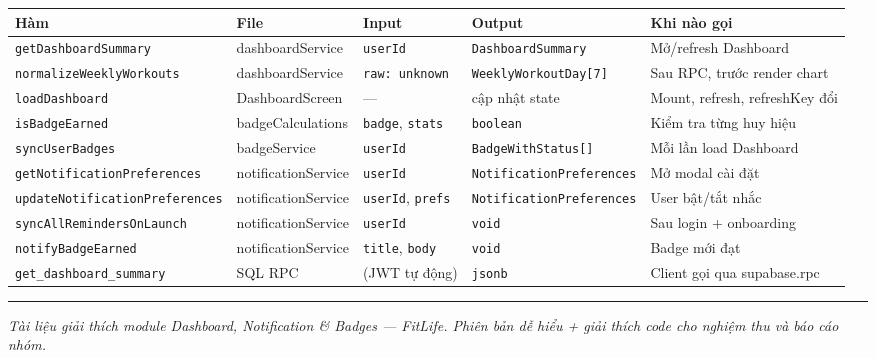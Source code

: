 \documentclass[12pt,a4paper]{article}
\newcounter{none}
\begin{document}
{\def\LTcaptype{none} %
\begin{longtable}[]{@{}
  >{\raggedright\arraybackslash}p{}
  >{\raggedright\arraybackslash}p{}
  >{\raggedright\arraybackslash}p{}
  >{\raggedright\arraybackslash}p{}
  >{\raggedright\arraybackslash}p{}@{}}
\toprule\noalign{}
\begin{minipage}[b]{\linewidth}\raggedright
Hàm
\end{minipage} & \begin{minipage}[b]{\linewidth}\raggedright
File
\end{minipage} & \begin{minipage}[b]{\linewidth}\raggedright
Input
\end{minipage} & \begin{minipage}[b]{\linewidth}\raggedright
Output
\end{minipage} & \begin{minipage}[b]{\linewidth}\raggedright
Khi nào gọi
\end{minipage} \\
\midrule\noalign{}
\endhead
\bottomrule\noalign{}
\endlastfoot
\texttt{getDashboardSummary} & dashboardService & \texttt{userId} &
\texttt{DashboardSummary} & Mở/refresh Dashboard \\
\texttt{normalizeWeeklyWorkouts} & dashboardService &
\texttt{raw:\ unknown} & \texttt{WeeklyWorkoutDay{[}7{]}} & Sau RPC,
trước render chart \\
\texttt{loadDashboard} & DashboardScreen & --- & cập nhật state & Mount,
refresh, refreshKey đổi \\
\texttt{isBadgeEarned} & badgeCalculations & \texttt{badge},
\texttt{stats} & \texttt{boolean} & Kiểm tra từng huy hiệu \\
\texttt{syncUserBadges} & badgeService & \texttt{userId} &
\texttt{BadgeWithStatus{[}{]}} & Mỗi lần load Dashboard \\
\texttt{getNotificationPreferences} & notificationService &
\texttt{userId} & \texttt{NotificationPreferences} & Mở modal cài đặt \\
\texttt{updateNotificationPreferences} & notificationService &
\texttt{userId}, \texttt{prefs} & \texttt{NotificationPreferences} &
User bật/tắt nhắc \\
\texttt{syncAllRemindersOnLaunch} & notificationService &
\texttt{userId} & \texttt{void} & Sau login + onboarding \\
\texttt{notifyBadgeEarned} & notificationService & \texttt{title},
\texttt{body} & \texttt{void} & Badge mới đạt \\
\texttt{get\_dashboard\_summary} & SQL RPC & (JWT tự động) &
\texttt{jsonb} & Client gọi qua supabase.rpc \\
\end{longtable}
}

\begin{center}\rule{0.5\linewidth}{0.5pt}\end{center}

\emph{Tài liệu giải thích module Dashboard, Notification \& Badges ---
FitLife. Phiên bản dễ hiểu + giải thích code cho nghiệm thu và báo cáo
nhóm.}
\end{document}
